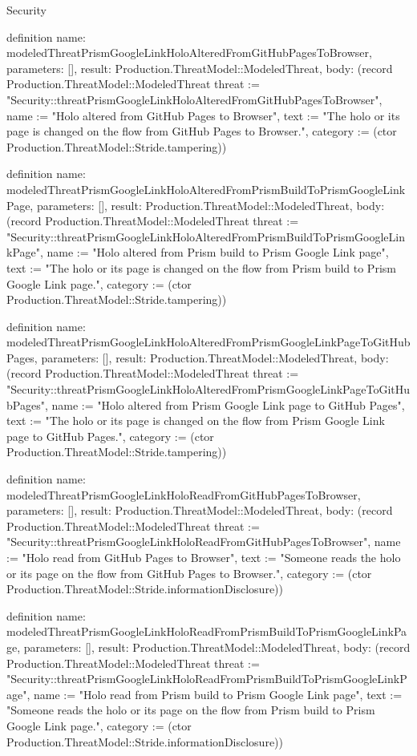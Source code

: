 \begin{lexlean}{Security}
\begin{semanticmodule}
definition{
  name: modeledThreatPrismGoogleLinkHoloAlteredFromGitHubPagesToBrowser,
  parameters: [],
  result: Production.ThreatModel::ModeledThreat,
  body: (record Production.ThreatModel::ModeledThreat {threat := "Security::threatPrismGoogleLinkHoloAlteredFromGitHubPagesToBrowser", name := "Holo altered from GitHub Pages to Browser", text := "The holo or its page is changed on the flow from GitHub Pages to Browser.", category := (ctor Production.ThreatModel::Stride.tampering)})
}

definition{
  name: modeledThreatPrismGoogleLinkHoloAlteredFromPrismBuildToPrismGoogleLinkPage,
  parameters: [],
  result: Production.ThreatModel::ModeledThreat,
  body: (record Production.ThreatModel::ModeledThreat {threat := "Security::threatPrismGoogleLinkHoloAlteredFromPrismBuildToPrismGoogleLinkPage", name := "Holo altered from Prism build to Prism Google Link page", text := "The holo or its page is changed on the flow from Prism build to Prism Google Link page.", category := (ctor Production.ThreatModel::Stride.tampering)})
}

definition{
  name: modeledThreatPrismGoogleLinkHoloAlteredFromPrismGoogleLinkPageToGitHubPages,
  parameters: [],
  result: Production.ThreatModel::ModeledThreat,
  body: (record Production.ThreatModel::ModeledThreat {threat := "Security::threatPrismGoogleLinkHoloAlteredFromPrismGoogleLinkPageToGitHubPages", name := "Holo altered from Prism Google Link page to GitHub Pages", text := "The holo or its page is changed on the flow from Prism Google Link page to GitHub Pages.", category := (ctor Production.ThreatModel::Stride.tampering)})
}

definition{
  name: modeledThreatPrismGoogleLinkHoloReadFromGitHubPagesToBrowser,
  parameters: [],
  result: Production.ThreatModel::ModeledThreat,
  body: (record Production.ThreatModel::ModeledThreat {threat := "Security::threatPrismGoogleLinkHoloReadFromGitHubPagesToBrowser", name := "Holo read from GitHub Pages to Browser", text := "Someone reads the holo or its page on the flow from GitHub Pages to Browser.", category := (ctor Production.ThreatModel::Stride.informationDisclosure)})
}

definition{
  name: modeledThreatPrismGoogleLinkHoloReadFromPrismBuildToPrismGoogleLinkPage,
  parameters: [],
  result: Production.ThreatModel::ModeledThreat,
  body: (record Production.ThreatModel::ModeledThreat {threat := "Security::threatPrismGoogleLinkHoloReadFromPrismBuildToPrismGoogleLinkPage", name := "Holo read from Prism build to Prism Google Link page", text := "Someone reads the holo or its page on the flow from Prism build to Prism Google Link page.", category := (ctor Production.ThreatModel::Stride.informationDisclosure)})
}


\end{semanticmodule}
\end{lexlean}
